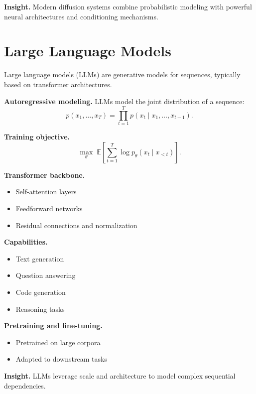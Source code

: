 \medskip

\noindent
\textbf{Insight.}  
Modern diffusion systems combine probabilistic modeling with powerful neural architectures and conditioning mechanisms.

\section{Large Language Models}

Large language models (LLMs) are generative models for sequences, typically based on transformer architectures.

\medskip

\noindent
\textbf{Autoregressive modeling.}  
LLMs model the joint distribution of a sequence:
\[
p(x_1, \dots, x_T) = \prod_{t=1}^T p(x_t \mid x_1, \dots, x_{t-1}).
\]

\medskip

\noindent
\textbf{Training objective.}
\[
\max_\theta \; \mathbb{E} \left[ \sum_{t=1}^T \log p_\theta(x_t \mid x_{<t}) \right].
\]

\medskip

\noindent
\textbf{Transformer backbone.}
\begin{itemize}
    \item Self-attention layers
    \item Feedforward networks
    \item Residual connections and normalization
\end{itemize}

\medskip

\noindent
\textbf{Capabilities.}
\begin{itemize}
    \item Text generation
    \item Question answering
    \item Code generation
    \item Reasoning tasks
\end{itemize}

\medskip

\noindent
\textbf{Pretraining and fine-tuning.}
\begin{itemize}
    \item Pretrained on large corpora
    \item Adapted to downstream tasks
\end{itemize}

\medskip

\noindent
\textbf{Insight.}  
LLMs leverage scale and architecture to model complex sequential dependencies.

